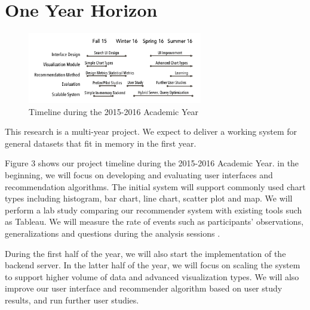 \section*{One Year Horizon}

\begingroup
\setlength{\columnsep}{16pt}

\begin{figure}
\vspace{-0.4in}

  \includegraphics[width=3in]{gantt-chart.png}
  \vspace{-0.3in}
  \caption{Timeline during the 2015-2016 Academic Year}

\label{fig:plan}
\vspace{-0.1in}
\end{figure}


This research is a multi-year project.  We expect to deliver a working system for general datasets that fit in memory in the first year.

Figure 3 shows our project timeline during the 2015-2016 Academic Year.
in the beginning, we will focus on developing and evaluating user interfaces and recommendation algorithms.
The initial system will support commonly used chart types including histogram, bar chart, line chart, scatter plot and map.
We will perform a lab study comparing our recommender system with existing tools such as Tableau.
We will measure the rate of events such as participants’ observations, generalizations and questions during the analysis sessions \cite{liu:latency}.

\endgroup

During the first half of the year, we will also start the implementation of the backend server.  In the latter half of the year, we will focus on scaling the system to support higher volume of data and advanced visualization types. We will also improve our user interface and recommender algorithm based on user study results, and run further user studies.


